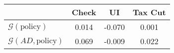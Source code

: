 \begin{tabular}{@{}lccc@{}} 
\toprule 
                          & Check      & UI    & Tax Cut    \\  \midrule 
$\mathcal{G}(\text{policy})$ & 0.014  & -0.070  & 0.001     \\ 
$\mathcal{G}(AD,\text{policy})$ & 0.069  & -0.009  & 0.022     \\ 
\end{tabular}  

